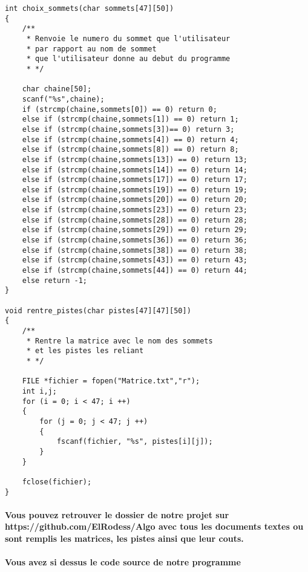 \documentclass[a4paper,11pt,fleqn]{article}
\begin{document}
\begin{lstlisting}
int choix_sommets(char sommets[47][50])
{
	/**
	 * Renvoie le numero du sommet que l'utilisateur 
	 * par rapport au nom de sommet 
	 * que l'utilisateur donne au debut du programme
	 * */
	 
	char chaine[50];
	scanf("%s",chaine);
	if (strcmp(chaine,sommets[0]) == 0) return 0;
	else if (strcmp(chaine,sommets[1]) == 0) return 1;
	else if (strcmp(chaine,sommets[3])== 0) return 3;
	else if (strcmp(chaine,sommets[4]) == 0) return 4;
	else if (strcmp(chaine,sommets[8]) == 0) return 8;
	else if (strcmp(chaine,sommets[13]) == 0) return 13;
	else if (strcmp(chaine,sommets[14]) == 0) return 14;
	else if (strcmp(chaine,sommets[17]) == 0) return 17;
	else if (strcmp(chaine,sommets[19]) == 0) return 19;
	else if (strcmp(chaine,sommets[20]) == 0) return 20;
	else if (strcmp(chaine,sommets[23]) == 0) return 23;
	else if (strcmp(chaine,sommets[28]) == 0) return 28;
	else if (strcmp(chaine,sommets[29]) == 0) return 29;
	else if (strcmp(chaine,sommets[36]) == 0) return 36;
	else if (strcmp(chaine,sommets[38]) == 0) return 38;
	else if (strcmp(chaine,sommets[43]) == 0) return 43;
	else if (strcmp(chaine,sommets[44]) == 0) return 44;
	else return -1;
}

void rentre_pistes(char pistes[47][47][50])
{
	/**
	 * Rentre la matrice avec le nom des sommets 
	 * et les pistes les reliant 
	 * */
	 
	FILE *fichier = fopen("Matrice.txt","r");
	int i,j;
	for (i = 0; i < 47; i ++)
	{
		for (j = 0; j < 47; j ++)
		{
			fscanf(fichier, "%s", pistes[i][j]);
		}
	}
	
	fclose(fichier);
}
\end{lstlisting}

\paragraph{Vous pouvez retrouver le dossier de notre projet sur https://github.com/ElRodess/Algo avec tous les documents textes ou sont remplis les matrices, les pistes ainsi que leur couts.
}                                                                                                                                                                                                                                                                                                                                                                                                                                                                                                                                                                                                                                                             
\paragraph{Vous avez si dessus le code source de notre programme}
\end{document}
